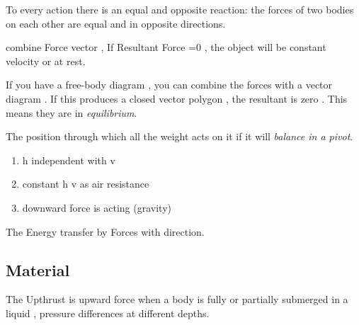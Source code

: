 \documentclass[a4paper]{article}
\begin{document}
\begin{law}
  To every action there is an equal and opposite reaction: the forces of two bodies on each other are equal and in opposite directions.
\end{law}

\begin{defi}
combine Force vector , If Resultant Force =0 , the object will be constant velocity or at rest.
\end{defi}

\begin{defi}
  If you have a free-body diagram , you can combine the forces with a vector diagram . If this produces a closed vector polygon , the resultant is zero . This means they are in \emph{equilibrium}.
 
  
\end{defi}

\begin{defi}

  
\end{defi}


\begin{defi}
  The position through which all the weight acts on it if it will \emph{balance in a pivot}.

\begin{defi}
\begin{enumerate}
    \item h independent with v
    \item constant h v as air resistance
    \item downward force is acting (gravity)
\end{enumerate}
\end{defi}

\end{defi}
\begin{defi}
  The Energy transfer by Forces with direction.
\end{defi}

\subsection{Material}
\begin{defi}[Density]

\end{defi}
\begin{defi}[Upthrust]
  The Upthrust is upward force when a body is fully or partially submerged in a liquid , pressure differences at different depths.
\end{defi}
\end{document}
